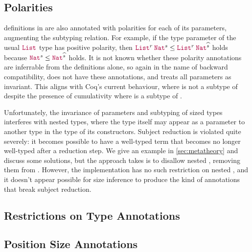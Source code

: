 \subsection{Polarities}

\Coinductive definitions in \CIChatminus are also annotated with polarities for each of its parameters, augmenting the subtyping relation.
For example, if the type parameter of the usual $\List$ type has positive polarity,
then $\app{\List^r}{\Nat^s} \leq \app{\List^r}{\Nat^{\succ{s}}}$ holds
because $\Nat^s \leq \Nat^{\succ{s}}$ holds.
It is not known whether these polarity annotations are inferrable from the \coinductive definitions alone,
so again in the name of backward compatibility, \lang does not have these annotations,
and treats all parameters as invariant.
This aligns with Coq's current behaviour, where  is not a subtype of 
despite the presence of cumulativity where  is a subtype of .

Unfortunately, the invariance of parameters and subtyping of sized \coinductive types interferes with nested \coinductive types,
where the type itself may appear as a parameter to another type in the type of its constructors.
Subject reduction is violated quite severely: it becomes possible to have a well-typed term that becomes no longer well-typed after a reduction step.
We give an example in \autoref{sec:metatheory} and discuss some solutions,
but the approach \lang takes is to disallow nested \coinductives,
removing them from \CIChatminus.
However, the implementation has no such restriction on nested \coinductives,
and it doesn't appear possible for size inference to produce the kind of annotations that break subject reduction.


\subsection{Restrictions on Type Annotations}


\subsection{Position Size Annotations}


